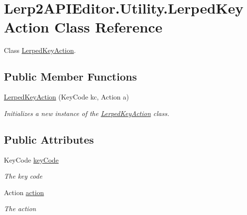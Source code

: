 \hypertarget{class_lerp2_a_p_i_editor_1_1_utility_1_1_lerped_key_action}{}\section{Lerp2\+A\+P\+I\+Editor.\+Utility.\+Lerped\+Key\+Action Class Reference}
\label{class_lerp2_a_p_i_editor_1_1_utility_1_1_lerped_key_action}


Class \hyperlink{class_lerp2_a_p_i_editor_1_1_utility_1_1_lerped_key_action}{Lerped\+Key\+Action}.  


\subsection*{Public Member Functions}
\begin{DoxyCompactItemize}
\item 
\hyperlink{class_lerp2_a_p_i_editor_1_1_utility_1_1_lerped_key_action_af1034728386c1896671ef10ee91779a5}{Lerped\+Key\+Action} (Key\+Code kc, Action a)
\begin{DoxyCompactList}\small\item\em Initializes a new instance of the \hyperlink{class_lerp2_a_p_i_editor_1_1_utility_1_1_lerped_key_action}{Lerped\+Key\+Action} class. \end{DoxyCompactList}\end{DoxyCompactItemize}
\subsection*{Public Attributes}
\begin{DoxyCompactItemize}
\item 
Key\+Code \hyperlink{class_lerp2_a_p_i_editor_1_1_utility_1_1_lerped_key_action_a30cbfef41ad0f5739a249a06848672b2}{key\+Code}
\begin{DoxyCompactList}\small\item\em The key code \end{DoxyCompactList}\item 
Action \hyperlink{class_lerp2_a_p_i_editor_1_1_utility_1_1_lerped_key_action_a7b1a773c42808e56972b45ba2f11681d}{action}
\begin{DoxyCompactList}\small\item\em The action \end{DoxyCompactList}\end{DoxyCompactItemize}


